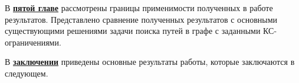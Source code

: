 В \underline{\textbf{пятой главе}} рассмотрены границы применимости полученных в работе результатов. Представлено сравнение полученных результатов с основными существующими решениями задачи поиска путей в графе с заданными КС-ограничениями.

\FloatBarrier
{}                                  %
В \underline{\textbf{заключении}} приведены основные результаты работы, которые заключаются в следующем.




\section*{\bibtitleauthor}
